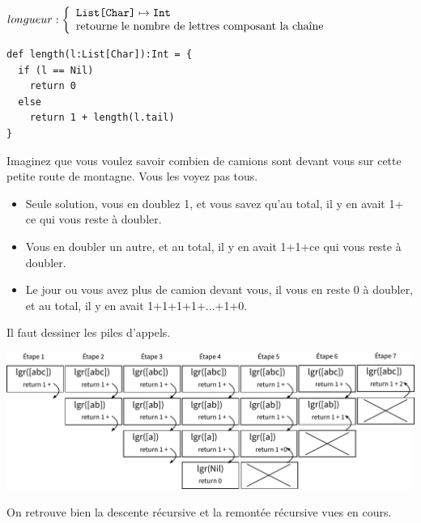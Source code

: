 \documentclass[10pt]{article}\usepackage[correction,nu]{esial}
\begin{document}
\newcommand{\Type}[1]{\text{\texttt{#1}}}
\begin{Question}
  $longueur: \left\{
    \begin{array}{l}
      \Type{List[Char]}\mapsto \Type{Int}\\
      \text{retourne le nombre de lettres composant la chaîne}
    \end{array}\right.$
\end{Question}
\begin{Reponse}
  \begin{Verbatim}[label=longueur(ch)]
def length(l:List[Char]):Int = {
  if (l == Nil)
    return 0
  else 
    return 1 + length(l.tail)
}
  \end{Verbatim}
  \begin{description}
    \item
    \item[Idée pour trouver comment faire:] Imaginez que vous voulez savoir
      combien de camions sont devant vous sur cette petite route de
      montagne. Vous les voyez pas tous.
      \begin{itemize}
      \item Seule solution, vous en doublez 1, et vous savez qu'au total, il y
        en avait 1+ ce qui vous reste à doubler.
      \item  Vous en doubler un autre, et au total, il y en avait 1+1+ce qui
        vous reste à doubler.
      \item Le jour ou vous avez plus de camion devant vous, il vous en reste 0
        à doubler, et au total, il y en avait 1+1+1+1+...+1+0.
      \end{itemize}
    \item[Pour se persuader que cela fonctionne:] Il faut dessiner les piles
      d'appels.

      \includegraphics[width=\linewidth]{img/lgr.pdf}

      On retrouve bien la descente récursive et la remontée récursive vues en
      cours.


\end{description}
\end{Reponse}
\end{document}

